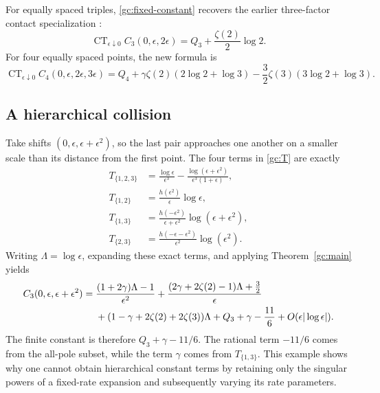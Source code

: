 For equally spaced triples, \eqref{gc:fixed-constant} recovers the earlier
three-factor contact specialization \cite{RepoMixed}:
\[
 \operatorname{CT}_{\epsilon\downarrow0}
 C_3(0,\epsilon,2\epsilon)=Q_3+\frac{\zeta(2)}2\log2.
\]
For four equally spaced points, the new formula is
\begin{equation}\label{gc:quartic-example}
 \operatorname{CT}_{\epsilon\downarrow0}
 C_4(0,\epsilon,2\epsilon,3\epsilon)
 =Q_4+\gamma\zeta(2)(2\log2+\log3)
       -\frac32\zeta(3)(3\log2+\log3).
\end{equation}

\subsection{A hierarchical collision}
Take shifts $(0,\epsilon,\epsilon+\epsilon^2)$, so the last pair approaches
one another on a smaller scale than its distance from the first point.
The four terms in \eqref{gc:T} are exactly
\begin{align*}
 T_{\{1,2,3\}}&=\frac{\log\epsilon}{\epsilon^3}
 -\frac{\log(\epsilon+\epsilon^2)}{\epsilon^3(1+\epsilon)},\\
 T_{\{1,2\}}&=\frac{h(\epsilon^2)}\epsilon\log\epsilon,\\
 T_{\{1,3\}}&=\frac{h(-\epsilon^2)}{\epsilon+\epsilon^2}
                         \log(\epsilon+\epsilon^2),\\
 T_{\{2,3\}}&=\frac{h(-\epsilon-\epsilon^2)}{\epsilon^2}
                         \log(\epsilon^2).
\end{align*}
Writing $\Lambda=\log\epsilon$, expanding these exact terms, and applying
Theorem~\ref{gc:main} yields
\begin{align}\label{gc:hierarchy}
 C_3(0,\epsilon,\epsilon+\epsilon^2)
 ={}&\frac{(1+2\gamma)\Lambda-1}{\epsilon^2}
 +\frac{(2\gamma+2\zeta(2)-1)\Lambda+\tfrac32}{\epsilon}\notag\\
 &+(1-\gamma+2\zeta(2)+2\zeta(3))\Lambda
 +Q_3+\gamma-\frac{11}{6}
 +O(\epsilon|\log\epsilon|).
\end{align}
The finite constant is therefore $Q_3+\gamma-11/6$.  The rational term
$-11/6$ comes from the all-pole subset, while the term $\gamma$ comes from
$T_{\{1,3\}}$.  This example shows why one cannot obtain hierarchical
constant terms by retaining only the singular powers of a fixed-rate
expansion and subsequently varying its rate parameters.

